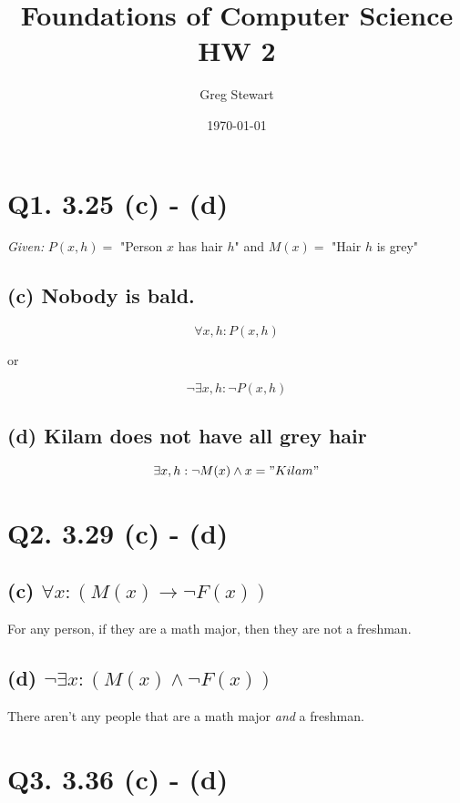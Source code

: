 \documentclass{article}
\title{Foundations of Computer Science HW 2}
\author{Greg Stewart}
\date{\today}
\begin{document}
\maketitle

\section*{Q1. 3.25 (c) - (d)}

\textit{Given:} $P(x, h) = $ "Person $x$ has hair $h$" and $M(x) = $ "Hair $h$ is grey"

\subsection*{(c) \normalsize Nobody is bald.}

$$\forall x,h : P(x,h)$$

or

$$\neg \exists x,h : \neg P(x,h)$$

\subsection*{(d) \normalsize Kilam does not have all grey hair}

$$\exists x,h : \neg M(x) \wedge x = "Kilam"$$ 


\section*{Q2. 3.29 (c) - (d)}

\subsection*{(c) \normalsize $\forall x : (M(x) \rightarrow \neg F(x))$}

For any person, if they are a math major, then they are not a freshman.

\subsection*{(d) \normalsize $\neg \exists x : (M(x) \wedge \neg F(x))$}

There aren't any people that are a math major \textit{and} a freshman.



\section*{Q3. 3.36 (c) - (d)}
\end{document}

